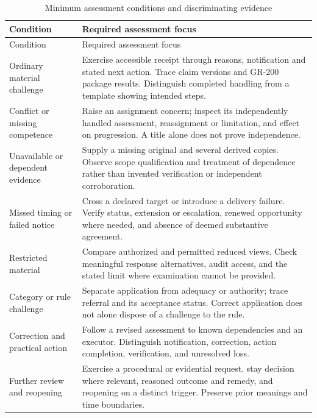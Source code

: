 \documentclass[11pt,a4paper]{article}
\begin{document}
\begin{longtable}{@{}L{0.24\textwidth}L{0.66\textwidth}@{}}
\caption{Minimum assessment conditions and discriminating evidence}\label{tab:c210-assessment}\\
\toprule Condition & Required assessment focus \\
\midrule\endfirsthead
\toprule Condition & Required assessment focus \\
\midrule\endhead
Ordinary material challenge & Exercise accessible receipt through reasons, notification and stated next action. Trace claim versions and GR-200 package results. Distinguish completed handling from a template showing intended steps. \\
Conflict or missing competence & Raise an assignment concern; inspect its independently handled assessment, reassignment or limitation, and effect on progression. A title alone does not prove independence. \\
Unavailable or dependent evidence & Supply a missing original and several derived copies. Observe scope qualification and treatment of dependence rather than invented verification or independent corroboration. \\
Missed timing or failed notice & Cross a declared target or introduce a delivery failure. Verify status, extension or escalation, renewed opportunity where needed, and absence of deemed substantive agreement. \\
Restricted material & Compare authorized and permitted reduced views. Check meaningful response alternatives, audit access, and the stated limit where examination cannot be provided. \\
Category or rule challenge & Separate application from adequacy or authority; trace referral and its acceptance status. Correct application does not alone dispose of a challenge to the rule. \\
Correction and practical action & Follow a revised assessment to known dependencies and an executor. Distinguish notification, correction, action completion, verification, and unresolved loss. \\
Further review and reopening & Exercise a procedural or evidential request, stay decision where relevant, reasoned outcome and remedy, and reopening on a distinct trigger. Preserve prior meanings and time boundaries. \\
\bottomrule
\end{longtable}

\end{document}
